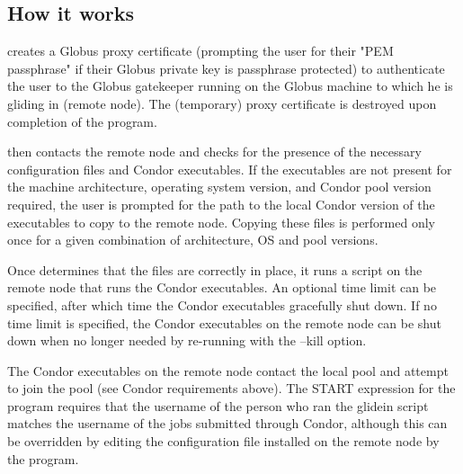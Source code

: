 \subsection{How it works}
 creates a Globus proxy certificate (prompting the user
for their "PEM passphrase" if their Globus private key is passphrase
protected) to authenticate the user to the Globus gatekeeper running
on the Globus machine to which he is gliding in (remote node). The
(temporary) proxy certificate is destroyed upon completion of the 
 program.

 then contacts the remote node and checks for the
presence of the necessary configuration files and Condor executables.
If the executables are not present for the machine architecture, 
operating system version, and Condor pool version required, the
user is prompted for the path to the local Condor version of the
executables to copy to the remote node.
Copying these files is performed only once for a given combination of
architecture, OS and pool versions.

Once  determines that the files are correctly in place,
it runs a script on the remote node that runs the Condor executables.
An optional time limit can be specified, after which time the Condor 
executables gracefully shut down. If no time limit is specified, the 
Condor executables on the remote node can be shut down when no longer
needed by re-running  with the --kill option.

The Condor executables on the remote node contact the local pool and
attempt to join the pool (see Condor requirements above). The START
expression for the  program requires that the username
of the person who ran the glidein script matches the username of the
jobs submitted through Condor, although this can be overridden by
editing the configuration file installed on the remote node by the
 program.

